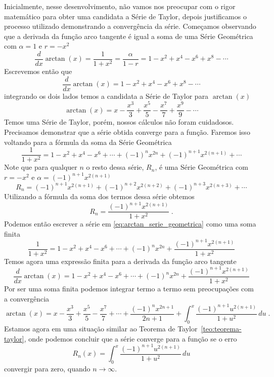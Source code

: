 Inicialmente, nesse desenvolvimento, não vamos nos preocupar com o
rigor matemático para obter uma candidata a Série de Taylor,
depois justificamos o processo utilizado demonstrando a
convergência da série.
Começamos observando que a derivada da função arco tangente
é igual a soma de uma Série Geométrica com $\alpha=1$ e $r=-x^2$
\[
\frac{d}{dx} \arctan(x)
= \frac{1}{1+x^2}
= \frac{\alpha}{1-r}
= 1 - x^2 + x^4 - x^6 + x^8 - \cdots
\]
Escrevemos então que
\[
\frac{d}{dx} \arctan(x) =  1 - x^2 + x^4 - x^6 + x^8 - \cdots
\]
integrando os dois lados temos a candidata a Série de Taylor para $\arctan(x)$
\[
\arctan(x) = x -\frac{x^3}{3} + \frac{x^5}{5} - \frac{x^7}{7} + \frac{x^9}{9} - \cdots
\]
Temos uma Série de Taylor, porém, nossos cálculos não foram cuidadosos.
Precisamos demonstrar que a série obtida converge para a função.
Faremos isso voltando para a fórmula da soma da Série Geométrica
\begin{equation}
  \label{eq:arctan_serie_geometrica}
  \frac{1}{1+x^2}
  = 1 - x^2 + x^4 - x^6 + \cdots
  + (-1)^n x^{2n}
  + (-1)^{n+1} x^{2(n+1)} + \cdots
\end{equation}
Note que para qualquer $n$ o resto dessa série, $R_n$,
é uma Série Geométrica com $r=-x^2$ e $\alpha=(-1)^{n+1} x^{2(n+1)}$
\[
R_n =
(-1)^{n+1} x^{2(n+1)} +
(-1)^{n+2} x^{2(n+2)} +
(-1)^{n+3} x^{2(n+3)} + \cdots
\]
Utilizando a fórmula da soma dos termos dessa série obtemos
\[
R_n = \frac{(-1)^{n+1} x^{2(n+1)}}{1+x^2}    \;.
\]
Podemos então escrever a série em \eqref{eq:arctan_serie_geometrica}
como uma soma finita
\[
\frac{1}{1+x^2}
= 1 - x^2 + x^4 - x^6 + \cdots
+ (-1)^n x^{2n}
+ \frac{(-1)^{n+1} x^{2(n+1)}}{1+x^2}
\]
Temos agora uma expressão finita para a derivada da função arco tangente
\[
\frac{d}{dx} \arctan(x)
= 1 - x^2 + x^4 - x^6
+ \cdots
+ (-1)^n x^{2n}
+ \frac{(-1)^{n+1} x^{2(n+1)}}{1+x^2}
\]
Por ser uma soma finita podemos integrar termo a termo
sem preocupações com a convergência
\[
\arctan(x) =
x - \frac{x^3}{3}
+ \frac{x^5}{5}
- \frac{x^7}{7}
+ \cdots
+ \frac{(-1)^n x^{2n+1}}{2n+1}
+ \int_0^x \frac{(-1)^{n+1} u^{2(n+1)}}{1+u^2} \,du   \;.
\]
Estamos agora em uma situação similar ao Teorema de Taylor~\ref{teo:teorema-taylor},
onde podemos concluir que a série converge para a função se o erro
\[
R_n(x) = \int_0^x \frac{(-1)^{n+1} u^{2(n+1)}}{1+u^2} \,du
\]
convergir para zero, quando $n\to\infty$.

